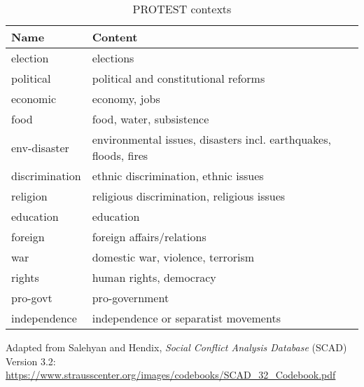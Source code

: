 \documentclass[11pt]{report}
\begin{document}
\begin{table}[htp]
\caption{PROTEST contexts}
\begin{center}
\begin{tabular}{|l|l|}
\hline
Name & Content \\
\hline
election   &   elections\\
political   &   political and constitutional reforms\\
economic &   economy, jobs\\
food           &   food, water, subsistence\\
env-disaster            &   environmental issues, disasters incl. earthquakes, floods, fires\\
discrimination            &   ethnic discrimination, ethnic issues\\
religion           &   religious discrimination, religious issues\\
education            &   education\\
foreign            &   foreign affairs/relations\\
war            &   domestic war, violence, terrorism\\
rights             &   human rights, democracy\\
pro-govt             &   pro-government\\
independence & independence or separatist movements\\
\hline
\end{tabular}
\end{center}
\label{tab:protestcontext}
\raggedright{Adapted from Salehyan and Hendix, \textit{Social Conflict Analysis Database} (SCAD)
Version 3.2: \url{https://www.strausscenter.org/images/codebooks/SCAD\_32\_Codebook.pdf}}\\~
\end{table}

\clearpage

\end{document}
